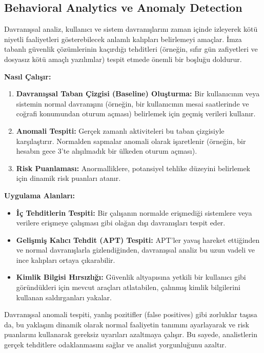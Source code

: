 \subsection{Behavioral Analytics ve Anomaly Detection}

Davranışsal analiz, kullanıcı ve sistem davranışlarını zaman içinde izleyerek kötü niyetli faaliyetleri gösterebilecek anlamlı kalıpları belirlemeyi amaçlar. İmza tabanlı güvenlik çözümlerinin kaçırdığı tehditleri (örneğin, sıfır gün zafiyetleri ve dosyasız kötü amaçlı yazılımlar) tespit etmede önemli bir boşluğu doldurur.

\textbf{Nasıl Çalışır:}

\begin{enumerate}
    \item \textbf{Davranışsal Taban Çizgisi (Baseline) Oluşturma:} Bir kullanıcının veya sistemin normal davranışını (örneğin, bir kullanıcının mesai saatlerinde ve coğrafi konumundan oturum açması) belirlemek için geçmiş verileri kullanır.
    \item \textbf{Anomali Tespiti:} Gerçek zamanlı aktiviteleri bu taban çizgisiyle karşılaştırır. Normalden sapmalar anomali olarak işaretlenir (örneğin, bir hesabın gece 3'te alışılmadık bir ülkeden oturum açması).
    \item \textbf{Risk Puanlaması:} Anormalliklere, potansiyel tehlike düzeyini belirlemek için dinamik risk puanları atanır.
\end{enumerate}

\textbf{Uygulama Alanları:}

\begin{itemize}
    \item \textbf{İç Tehditlerin Tespiti:} Bir çalışanın normalde erişmediği sistemlere veya verilere erişmeye çalışması gibi olağan dışı davranışları tespit eder.
    \item \textbf{Gelişmiş Kalıcı Tehdit (APT) Tespiti:} APT'ler yavaş hareket ettiğinden ve normal davranışlarla gizlendiğinden, davranışsal analiz bu uzun vadeli ve ince kalıpları ortaya çıkarabilir.
    \item \textbf{Kimlik Bilgisi Hırsızlığı:} Güvenlik altyapısına yetkili bir kullanıcı gibi göründükleri için mevcut araçları atlatabilen, çalınmış kimlik bilgilerini kullanan saldırganları yakalar.
\end{itemize}

Davranışsal anomali tespiti, yanlış pozitifler (false positives) gibi zorluklar taşısa da, bu yaklaşım dinamik olarak normal faaliyetin tanımını ayarlayarak ve risk puanlarını kullanarak gereksiz uyarıları azaltmaya çalışır. Bu sayede, analistlerin gerçek tehditlere odaklanmasını sağlar ve analist yorgunluğunu azaltır.

